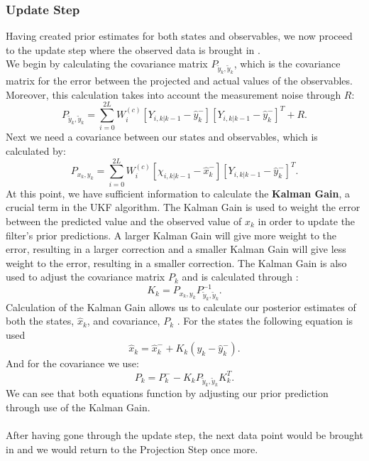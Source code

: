     \subsubsection{Update Step}
    Having created prior estimates for both states and observables, we now proceed to the update step where the observed data is brought in \cite{VanMereChapter}. \\
    
    We begin by calculating the covariance matrix $P_{\tilde{y}_k, \tilde{y}_k}$, which is the covariance matrix for the error between the projected and actual values of the observables. \\
    
    Moreover, this calculation takes into account the measurement noise through $R$:
    \begin{equation}
    P_{\tilde{y}_k, \tilde{y}_k} = \sum_{i=0}^{2L} W_i^{(c)} [Y_{i,k|k-1} - \hat{y}_k^-][Y_{i,k|k-1} - \hat{y}_k^-]^T + R. 
    \end{equation}
    Next we need a covariance between our states and observables, which is calculated by:
    \begin{equation}
    P_{{x}_k,{y}_k} = \sum_{i=0}^{2L} W_i^{(c)} [\chi_{i,k|k-1} - \hat{x}_k^-][Y_{i,k|k-1} - \hat{y}_k^-]^T.
    \end{equation}
    At this point, we have sufficient information to calculate the \textbf{Kalman Gain}, a crucial term in the UKF algorithm. The Kalman Gain is used to weight the error between the predicted value and the observed value of $x_k$ in order to update the filter's prior predictions. A larger Kalman Gain will give more weight to the error, resulting in a larger correction and a smaller Kalman Gain will give less weight to the error, resulting in a smaller correction. The Kalman Gain is also used to adjust the covariance matrix $P_k$ and is calculated through \cite{VanMereChapter}:
    \begin{equation}
    K_k = P_{x_k, y_k} P_{\tilde{y}_k, \tilde{y}_k}^{-1}. 
    \end{equation}
    Calculation of the Kalman Gain allows us to calculate our posterior estimates of both the states, $\hat{x}_k$, and covariance, $P_k$ \cite{VanMereChapter}. For the states the following equation is used
    \begin{equation}
    \hat{x}_k = \hat{x}_k^- + K_k(y_k - \hat{y}_k^-). 
    \end{equation}
    And for the covariance we use:
    \begin{equation} \label{eq:27ukf}
    P_k = P_k^-  - K_k P_{\tilde{y}_k, \tilde{y}_k} K_k^T.
    \end{equation}
    We can see that both equations function by adjusting our prior prediction through use of the Kalman Gain.\\
    \\
    After having gone through the update step, the next data point would be brought in and we would return to the Projection Step once more.

